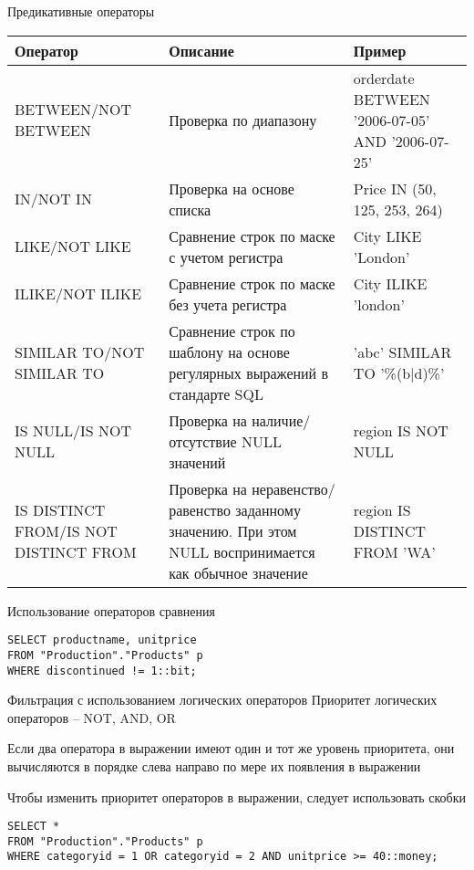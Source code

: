 \documentclass[12pt]{article}
\begin{document}
\begin{nota}{Предикативные операторы}
    \begin{center}
        \begin{tabular}{|m{10em}|m{17em}|m{10em}|}
            \hline
            Оператор & Описание & Пример \\
            \hline
            BETWEEN/NOT BETWEEN & Проверка по диапазону & orderdate BETWEEN '2006-07-05' AND '2006-07-25' \\
            \hline
            IN/NOT IN & Проверка на основе списка & Price IN (50, 125, 253, 264) \\
            \hline
            LIKE/NOT LIKE & Сравнение строк по маске с учетом регистра & City LIKE 'London' \\
            \hline
            ILIKE/NOT ILIKE & Сравнение строк по маске без учета регистра & City ILIKE 'london' \\
            \hline
            SIMILAR TO/NOT SIMILAR TO & Сравнение строк по шаблону на основе регулярных выражений в стандарте SQL & 'abc' SIMILAR TO '\%(b|d)\%' \\
            \hline
            IS NULL/IS NOT NULL & Проверка на наличие/отсутствие NULL значений & region IS NOT NULL \\
            \hline
            IS DISTINCT FROM/IS NOT DISTINCT FROM & Проверка на неравенство/равенство заданному значению. При этом NULL воспринимается как обычное значение & region IS DISTINCT FROM 'WA' \\
            \hline
        \end{tabular}
    \end{center}
\end{nota}

\begin{Example}{Использование операторов сравнения}
\begin{lstlisting}
SELECT productname, unitprice
FROM "Production"."Products" p 
WHERE discontinued != 1::bit;
\end{lstlisting}
\end{Example}

\begin{Example}{Фильтрация с использованием логических операторов}
    Приоритет логических операторов -- NOT, AND, OR 

    Если два оператора в выражении имеют один и тот же уровень приоритета, они вычисляются в порядке слева направо по мере их появления в выражении 

    Чтобы изменить приоритет операторов в выражении, следует использовать скобки

\begin{lstlisting}
SELECT * 
FROM "Production"."Products" p
WHERE categoryid = 1 OR categoryid = 2 AND unitprice >= 40::money;
\end{lstlisting}
\end{Example}
\end{document}
